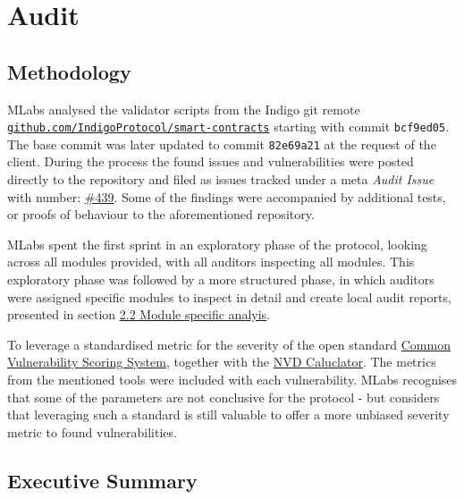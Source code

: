 \chapter{Audit}

\section{Methodology}

MLabs analysed the validator scripts from the Indigo git remote
\href{https://github.com/IndigoProtocol/smart-contracts}{\texttt{github.com/IndigoProtocol/smart-contracts}}
starting with commit \texttt{bcf9ed05}.  The base commit was later updated to
commit \texttt{82e69a21} at the request of the client. During the process the
found issues and vulnerabilities were posted directly to the repository and
filed as issues tracked under a meta \emph{Audit Issue} with number:
\href{https://github.com/IndigoProtocol/smart-contracts/issues/439}{\#439}.
Some of the findings were accompanied by additional tests, or proofs of
behaviour to the aforementioned repository.

MLabs spent the first sprint in an exploratory phase of the protocol,
looking across all modules provided, with all auditors inspecting all
modules. This exploratory phase was followed by a more structured phase,
in which auditors were assigned specific modules to inspect in detail
and create local audit reports, presented in section
\protect\hyperlink{22-module-specific-analyis}{2.2 Module specific
analyis}.

To leverage a standardised metric for the severity of the open standard
\href{https://www.first.org/cvss/}{Common Vulnerability Scoring System},
together with the
\href{https://nvd.nist.gov/vuln-metrics/cvss/v3-calculator}{NVD
Caluclator}. The metrics from the mentioned tools were included with
each vulnerability. MLabs recognises that some of the parameters are not
conclusive for the protocol - but considers that leveraging such a
standard is still valuable to offer a more unbiased severity metric to
found vulnerabilities.

\section{Executive Summary}


